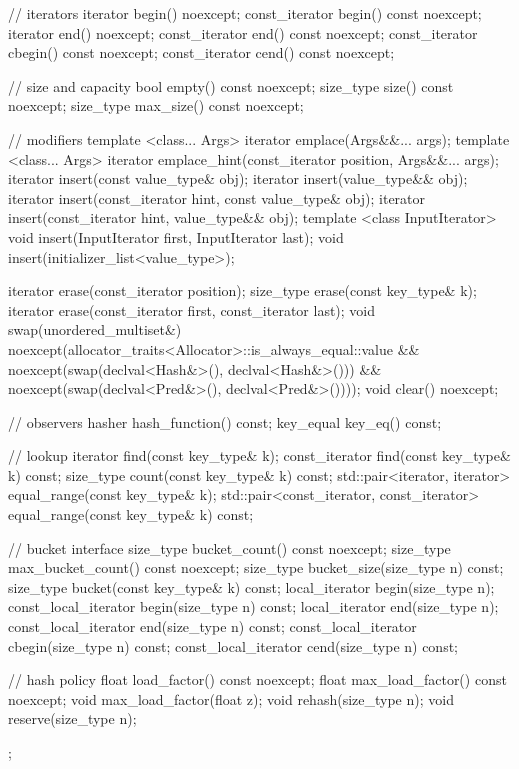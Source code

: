 \begin{codeblock}
{{    // iterators
    iterator       begin() noexcept;
    const_iterator begin() const noexcept;
    iterator       end() noexcept;
    const_iterator end() const noexcept;
    const_iterator cbegin() const noexcept;
    const_iterator cend() const noexcept;

    // size and capacity
    bool      empty() const noexcept;
    size_type size() const noexcept;
    size_type max_size() const noexcept;

    // modifiers
    template <class... Args> iterator emplace(Args&&... args);
    template <class... Args> iterator emplace_hint(const_iterator position, Args&&... args);
    iterator insert(const value_type& obj);
    iterator insert(value_type&& obj);
    iterator insert(const_iterator hint, const value_type& obj);
    iterator insert(const_iterator hint, value_type&& obj);
    template <class InputIterator> void insert(InputIterator first, InputIterator last);
    void insert(initializer_list<value_type>);

    iterator  erase(const_iterator position);
    size_type erase(const key_type& k);
    iterator  erase(const_iterator first, const_iterator last);
    void      swap(unordered_multiset&)
      noexcept(allocator_traits<Allocator>::is_always_equal::value &&
               noexcept(swap(declval<Hash&>(), declval<Hash&>())) &&
               noexcept(swap(declval<Pred&>(), declval<Pred&>())));
    void      clear() noexcept;

    // observers
    hasher hash_function() const;
    key_equal key_eq() const;

    // lookup
    iterator       find(const key_type& k);
    const_iterator find(const key_type& k) const;
    size_type      count(const key_type& k) const;
    std::pair<iterator, iterator>             equal_range(const key_type& k);
    std::pair<const_iterator, const_iterator> equal_range(const key_type& k) const;

    // bucket interface
    size_type bucket_count() const noexcept;
    size_type max_bucket_count() const noexcept;
    size_type bucket_size(size_type n) const;
    size_type bucket(const key_type& k) const;
    local_iterator begin(size_type n);
    const_local_iterator begin(size_type n) const;
    local_iterator end(size_type n);
    const_local_iterator end(size_type n) const;
    const_local_iterator cbegin(size_type n) const;
    const_local_iterator cend(size_type n) const;

    // hash policy
    float load_factor() const noexcept;
    float max_load_factor() const noexcept;
    void max_load_factor(float z);
    void rehash(size_type n);
    void reserve(size_type n);
  };

}
\end{codeblock}
